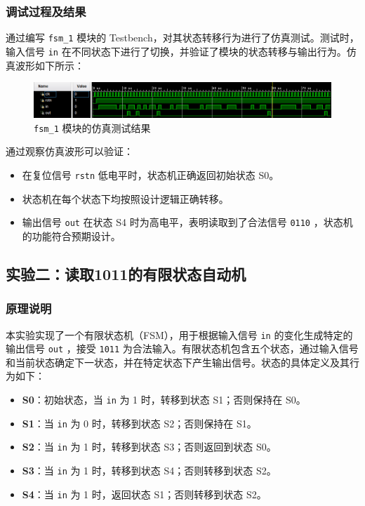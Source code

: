\documentclass[zihao=5, UTF8]{article}
\theoremstyle{MyLineTheoremStyle} %
\theoremstyle{MyBlockTheoremStyle} %
\theoremstyle{MySubsubsectionStyle} %
\begin{document}
\subsubsection{调试过程及结果}  
通过编写 \texttt{fsm\_1} 模块的 Testbench，对其状态转移行为进行了仿真测试。测试时，输入信号 \texttt{in} 在不同状态下进行了切换，并验证了模块的状态转移与输出行为。仿真波形如下所示：  
\begin{figure}[htbp]  
    \centering  
    \includegraphics[width=\textwidth]{fsm_1.png} %
    \caption{\texttt{fsm\_1} 模块的仿真测试结果}  
    \label{fig:fsm_1_simulation}  
\end{figure}  

通过观察仿真波形可以验证：  
\begin{itemize}  
    \item 在复位信号 \texttt{rstn} 低电平时，状态机正确返回初始状态 S0。  
    \item 状态机在每个状态下均按照设计逻辑正确转移。  
    \item 输出信号 \texttt{out} 在状态 S4 时为高电平，表明读取到了合法信号 \texttt{0110} ，状态机的功能符合预期设计。  
\end{itemize}  



\subsection{实验二：读取1011的有限状态自动机}  
\subsubsection{原理说明}  
本实验实现了一个有限状态机（FSM），用于根据输入信号 \texttt{in} 的变化生成特定的输出信号 \texttt{out} ，接受 \texttt{1011} 为合法输入。有限状态机包含五个状态，通过输入信号和当前状态确定下一状态，并在特定状态下产生输出信号。状态的具体定义及其行为如下：  
\begin{itemize}  
    \item \textbf{S0}：初始状态，当 \texttt{in} 为 1 时，转移到状态 S1；否则保持在 S0。  
    \item \textbf{S1}：当 \texttt{in} 为 0 时，转移到状态 S2；否则保持在 S1。  
    \item \textbf{S2}：当 \texttt{in} 为 1 时，转移到状态 S3；否则返回到状态 S0。  
    \item \textbf{S3}：当 \texttt{in} 为 1 时，转移到状态 S4；否则转移到状态 S2。  
    \item \textbf{S4}：当 \texttt{in} 为 1 时，返回状态 S1；否则转移到状态 S2。  
\end{itemize}  
\end{document}
